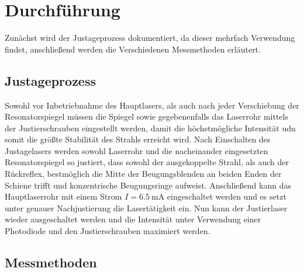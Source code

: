 \section{Durchführung}\label{sec:durchfuehrung}
Zunächst wird der Justageprozess dokumentiert, da dieser mehrfach Verwendung findet, anschließend werden die Verschiedenen Messmethoden erläutert.
\subsection{Justageprozess}
Sowohl vor Inbetriebnahme des Hauptlasers, als auch nach jeder Verschiebung der Resonatorspiegel müssen die Spiegel sowie gegebenenfalls das Laserrohr mittels der Justierschrauben eingestellt werden, damit die höchstmögliche Intensität udn somit die größte Stabilität des Strahls erreicht wird.
Nach Einschalten des Justagelasers werden sowohl Laserrohr und die nacheinander eingesetzten Resonatorspiegel so justiert, dass sowohl der ausgekoppelte Strahl, als auch der Rückreflex, bestmöglich die Mitte der Beugungsblenden an beiden Enden der Schiene trifft und konzentrische Beugungsringe aufweist.
Anschließend kann das Hauptlaserrohr mit einem Strom $I=\SI{6.5}{\milli\ampere}$ eingeschaltet werden und es setzt unter genauer Nachjustierung die Lasertätigkeit ein. Nun kann der Justierlaser wieder ausgeschaltet werden und die Intensität unter Verwendung einer Photodiode und den Justierschrauben maximiert werden.
\subsection{Messmethoden}